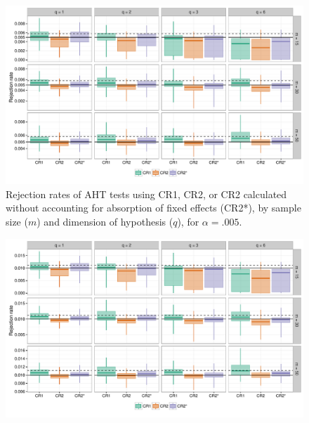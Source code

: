 \documentclass{article}\usepackage[]{graphicx}\usepackage[]{color}
\newenvironment{knitrout}{}{} %
\begin{document}
\begin{landscape}
\begin{knitrout}
\begin{figure}[H]
{\centering \includegraphics[width=\linewidth]{CR_fig/absorption_005-1} 

}

\caption[Rejection rates of AHT tests using CR1, CR2, or CR2 calculated without accounting for absorption of fixed effects (CR2*), by sample size (]{Rejection rates of AHT tests using CR1, CR2, or CR2 calculated without accounting for absorption of fixed effects (CR2*), by sample size ($m$) and dimension of hypothesis ($q$), for $\alpha = .005$.}\label{fig:absorption_005}
\end{figure}


\end{knitrout}

\begin{knitrout}
\color{fgcolor}\begin{figure}[H]

{\centering \includegraphics[width=\linewidth]{CR_fig/absorption_01-1} 

}


\end{figure}
\end{knitrout}
\end{landscape}
\end{document}
